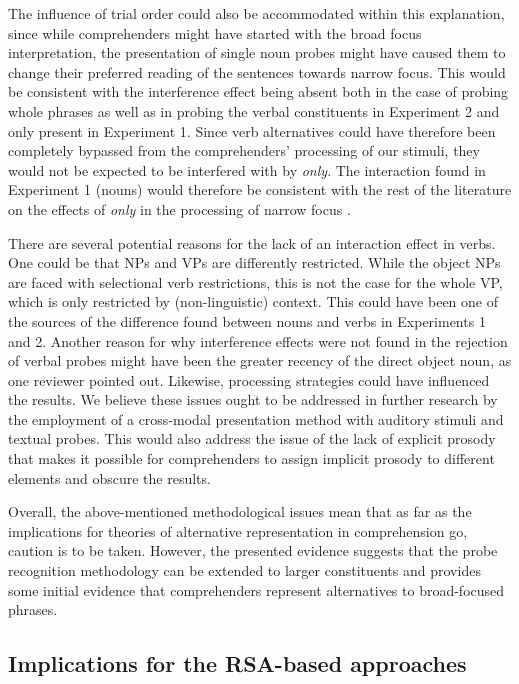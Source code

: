 \documentclass[output=paper,colorlinks,citecolor=brown]{langscibook}
\begin{document}
The influence of trial order could also be accommodated within this explanation, since while comprehenders might have started with the broad focus interpretation, the presentation of single noun probes might have caused them to change their preferred reading of the sentences towards narrow focus. This would be consistent with the interference effect being absent both in the case of probing whole phrases as well as in probing the verbal constituents in Experiment 2 and only present in Experiment 1. Since verb alternatives could have therefore been completely bypassed from the comprehenders’ processing of our stimuli, they would not be expected to be interfered with by \textit{only}. The interaction found in Experiment 1 (nouns) would therefore be consistent with the rest of the literature on the effects of \textit{only} in the processing of narrow focus \citep{gotzner2016impact,gotzner2017role}.


There are several potential reasons for the lack of an interaction effect in verbs. One could be that NPs and VPs are differently restricted. While the object NPs are faced with selectional verb restrictions, this is not the case for the whole VP, which is only restricted by (non-linguistic) context. This could have been one of the sources of the difference found between nouns and verbs in Experiments 1 and 2.
Another reason for why interference effects were not found in the rejection of verbal probes might have been the greater recency of the direct object noun, as one reviewer pointed out. Likewise, processing strategies could have influenced the results. We believe these issues ought to be addressed in further research by the employment of a cross-modal presentation method with auditory stimuli and textual probes. This would also address the issue of the lack of explicit prosody that makes it possible for comprehenders to assign implicit prosody to different elements and obscure the results.


Overall, the above-mentioned methodological issues mean that as far as the implications for theories of alternative representation in comprehension go, caution is to be taken. However, the presented evidence suggests that the probe recognition methodology can be extended to larger constituents and provides some initial evidence that comprehenders represent alternatives to broad-focused phrases.

\subsection{Implications for the RSA-based approaches}
\end{document}
